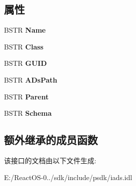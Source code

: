 \subsection*{属性}
\begin{DoxyCompactItemize}
\item 
\mbox{\label{interface_i_a_ds_aedb493e50e0b1aad2d1ce8e10ac5d9b1}} 
B\+S\+TR {\bfseries Name}
\item 
\mbox{\label{interface_i_a_ds_a40e068d6008c96dbeec3819e15516cf8}} 
B\+S\+TR {\bfseries Class}
\item 
\mbox{\label{interface_i_a_ds_a3ba57f289e836149559c757389b4993b}} 
B\+S\+TR {\bfseries G\+U\+ID}
\item 
\mbox{\label{interface_i_a_ds_a9e8410309d8bf6886529e72dc4813c8e}} 
B\+S\+TR {\bfseries A\+Ds\+Path}
\item 
\mbox{\label{interface_i_a_ds_ae8ca9d1dc6dac835d233cb4f29eaf305}} 
B\+S\+TR {\bfseries Parent}
\item 
\mbox{\label{interface_i_a_ds_aaedc21fd66af96c8ab1b71bb8ca91ba2}} 
B\+S\+TR {\bfseries Schema}
\end{DoxyCompactItemize}
\subsection*{额外继承的成员函数}


该接口的文档由以下文件生成\+:\begin{DoxyCompactItemize}
\item 
E\+:/\+React\+O\+S-\/0../sdk/include/psdk/iads.\+idl\end{DoxyCompactItemize}

